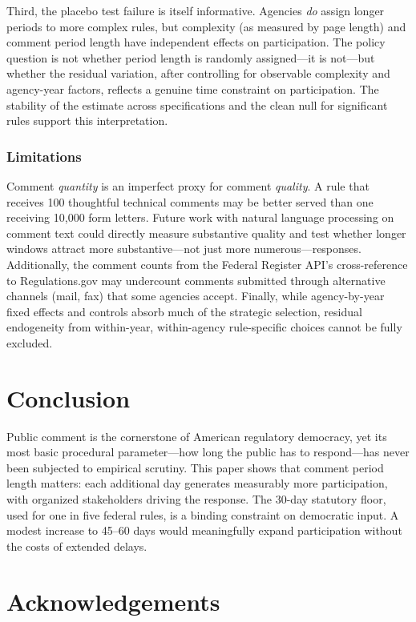 \documentclass[12pt]{article}
\begin{document}
Third, the placebo test failure is itself informative. Agencies \textit{do} assign longer periods to more complex rules, but complexity (as measured by page length) and comment period length have independent effects on participation. The policy question is not whether period length is randomly assigned---it is not---but whether the residual variation, after controlling for observable complexity and agency-year factors, reflects a genuine time constraint on participation. The stability of the estimate across specifications and the clean null for significant rules support this interpretation.

\subsubsection*{Limitations} Comment \textit{quantity} is an imperfect proxy for comment \textit{quality}. A rule that receives 100 thoughtful technical comments may be better served than one receiving 10,000 form letters. Future work with natural language processing on comment text \citep{livermore2014regulatory} could directly measure substantive quality and test whether longer windows attract more substantive---not just more numerous---responses. Additionally, the comment counts from the Federal Register API's cross-reference to Regulations.gov may undercount comments submitted through alternative channels (mail, fax) that some agencies accept. Finally, while agency-by-year fixed effects and controls absorb much of the strategic selection, residual endogeneity from within-year, within-agency rule-specific choices cannot be fully excluded.

\section{Conclusion}

Public comment is the cornerstone of American regulatory democracy, yet its most basic procedural parameter---how long the public has to respond---has never been subjected to empirical scrutiny. This paper shows that comment period length matters: each additional day generates measurably more participation, with organized stakeholders driving the response. The 30-day statutory floor, used for one in five federal rules, is a binding constraint on democratic input. A modest increase to 45--60 days would meaningfully expand participation without the costs of extended delays.

\section*{Acknowledgements}
\end{document}
